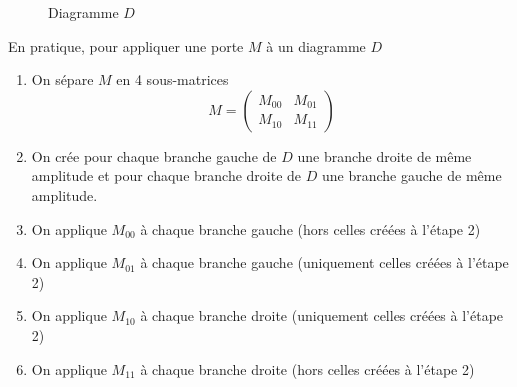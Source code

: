 \begin{figure}[ht]
  \centering
\caption{Diagramme $D$}
\label{fig:D_avant_porte}
\end{figure}

En pratique, pour appliquer une porte $M$ à un diagramme $D$
\begin{enumerate}
  \item On sépare $M$ en 4 sous-matrices
  $$M = \begin{pmatrix}
    M_{00} & M_{01} \\
    M_{10} & M_{11}
  \end{pmatrix}$$
  \item On crée pour chaque branche gauche de $D$ une branche droite  de même amplitude et pour chaque branche droite de $D$ une branche gauche de même amplitude.
  \item On applique $M_{00}$ à chaque branche gauche (hors celles créées à l'étape 2)
  \item On applique $M_{01}$ à chaque branche gauche (uniquement celles créées à l'étape 2)
  \item On applique $M_{10}$ à chaque branche droite (uniquement celles créées à l'étape 2)
  \item On applique $M_{11}$ à chaque branche droite (hors celles créées à l'étape 2)
\end{enumerate}

